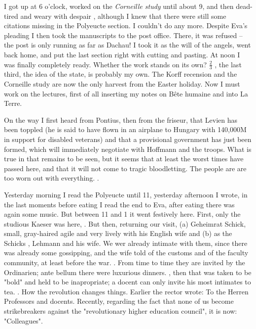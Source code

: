 
I got up at 6 o'clock, worked on the \textit{Corneille study} until about 9, and then dead-tired and weary with despair , although I knew that there were still some citations missing in the Polyeucte section. I couldn't do any more. Despite Eva's pleading I then took the manuscripts to the post office. There, it was refused -- the post is only running as far as Dachau! I took it as the will of the angels, went back home, and  put the last section right with cutting and pasting. At noon I was finally completely ready. Whether the work stands on its own? $\frac{2}{3}$ , the last third, the idea of the state, is probably my own. The Korff recension and the Corneille study are now the only harvest from the Easter holiday. Now I must work on the lectures, first of all inserting my notes on Bête humaine and  into La Terre.

On the way I first heard from Pontius, then from the friseur, that Levien has been toppled (he is said to have flown in an airplane to Hungary with 140,000M in support for disabled veterans) and that a provisional government has just been formed, which will immediately negotiate with Hoffmann and the troops. What is true in that remains to be seen, but it seems that at least the worst times have passed here, and  that it will not come to tragic bloodletting. The people are are too worn out with everything. .

Yesterday morning I read the Polyeucte until 11, yesterday afternoon I wrote, in the last moments before eating I read the end to Eva, after eating there was again some music. But between 11 and 1 it went festively here. First, only the studious Kaeser was here, . But then, returning our visit, (a) Geheimrat Schick, small, gray-haired agile and very lively with his English wife and (b) as the Schicks , Lehmann and his wife. We wer already intimate with them, since there was already some gossipping, and the wife told of the customs and  of the faculty community, at least before the war. . From time to time they are invited by the Ordinarien; ante bellum there were luxurious dinners. , then that was taken to be "bold" and held to be inapropriate; a docent can only invite his most intimates to tea. . How the revolution changes things. Earlier the rector wrote: To the Herren Professors and docents. Recently, regarding the fact that none of us become strikebreakers against the "revolutionary higher education council", it is now: "Colleagues".

